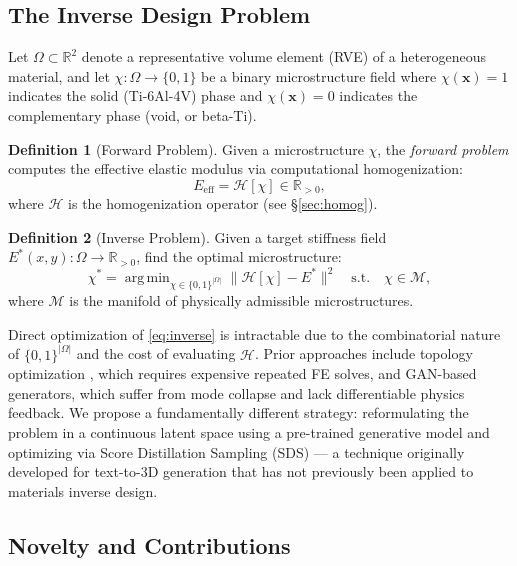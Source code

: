\documentclass[12pt,a4paper]{article}
\newcommand{\R}{\mathbb{R}}
\newcommand{\Eeff}{E_{\mathrm{eff}}}
\newcommand{\Etar}{E^{*}}
\newcommand{\xvec}{\bm{x}}
\DeclareMathOperator*{\argmin}{arg\,min}
\theoremstyle{definition}
\newtheorem{definition}{Definition}
\begin{document}
\subsection{The Inverse Design Problem}

Let $\Omega \subset \R^2$ denote a representative volume element (RVE) of a
heterogeneous material, and let $\chi : \Omega \to \{0,1\}$ be a binary
microstructure field where $\chi(\xvec)=1$ indicates the solid (Ti-6Al-4V)
phase and $\chi(\xvec)=0$ indicates the complementary phase (void, or beta-Ti).

\begin{definition}[Forward Problem]
Given a microstructure $\chi$, the \emph{forward problem} computes the
effective elastic modulus via computational homogenization:
\begin{equation}
  \Eeff = \mathcal{H}[\chi] \in \R_{>0},
  \label{eq:forward}
\end{equation}
where $\mathcal{H}$ is the homogenization operator (see \S\ref{sec:homog}).
\end{definition}

\begin{definition}[Inverse Problem]
Given a target stiffness field $\Etar(x,y) : \Omega \to \R_{>0}$, find the
optimal microstructure:
\begin{equation}
  \chi^{*} = \argmin_{\chi \in \{0,1\}^{|\Omega|}}
    \bigl\| \mathcal{H}[\chi] - \Etar \bigr\|^2
    \quad \text{s.t.} \quad \chi \in \mathcal{M},
  \label{eq:inverse}
\end{equation}
where $\mathcal{M}$ is the manifold of physically admissible
microstructures.
\end{definition}

Direct optimization of \eqref{eq:inverse} is intractable due to the
combinatorial nature of $\{0,1\}^{|\Omega|}$ and the cost of evaluating
$\mathcal{H}$.  Prior approaches include topology optimization
\cite{zohdi2005}, which requires expensive repeated FE solves, and
GAN-based generators, which suffer from mode collapse and lack
differentiable physics feedback.  We propose a fundamentally different
strategy: reformulating the problem in a continuous latent space using a
pre-trained generative model and optimizing via Score Distillation Sampling
(SDS) --- a technique originally developed for text-to-3D generation
\cite{poole2023dreamfusion} that has not previously been applied to
materials inverse design.

\subsection{Novelty and Contributions}
\end{document}
